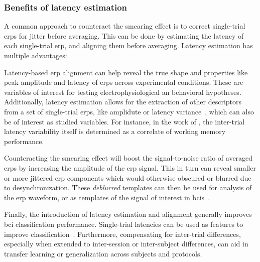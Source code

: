\subsubsection{Benefits of latency estimation}
A common approach to counteract the smearing effect is to correct single-trial
\acp{erp} for jitter before averaging.
This can be done by estimating the latency of each
single-trial \ac{erp}, and aligning them before averaging.
Latency estimation has multiple advantages:
\begin{enumerate*}[label={(\arabic*)}]
	\item Latency-based \ac{erp} alignment can help reveal the true shape and
	properties like peak amplitude and latency of \acp{erp} across
	experimental conditions. These are variables of interest for
	testing electrophysiological an behavioral hypotheses.
	Additionally, latency estimation allows for the extraction of
	other descriptors from a set of single-trial \acp{erp}, like
	amplidute or latency variance~\cite{Hultsch2004}, which can
	also be of interest as studied variables.
  For instance, in the work of \textcite{Saville2014}, the inter-trial latency
  variability itself is determined as a correlate of working memory performance.
	\item Counteracting the smearing effect will boost the signal-to-noise
	ratio of averaged \acp{erp} by increasing the amplitude of the
	\ac{erp} signal. This in turn can reveal smaller or more jittered \ac{erp}
  components which would otherwise obscured or blurred due to desynchronization.
    These \emph{deblurred} templates can then be used for analysis of the \ac{erp}
	waveform, or as templates of the signal of interest in
	\acp{bci}~\cite{Arico2014}.
	\item Finally, the introduction of latency estimation and alignment generally
	improves \ac{bci} classification performance.
  Single-trial latencies can be	used as features to improve
  classification~\cite{Hardiansyah2020}.
	Furthermore, compensating for inter-trial differences, especially when
	extended to inter-session or inter-subject differences, can aid in transfer learning or
	generalization across subjects and protocols\cite{Iturrate2014}.
\end{enumerate*}

